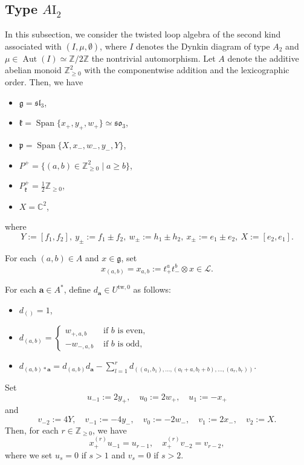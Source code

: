 \documentclass[12pt,a4paper]{amsart}
\theoremstyle{definition}
\numberwithin{equation}{subsection}
\begin{document}
\subsection{Type $A\mathrm{I}_2$}
In this subsection, we consider the twisted loop algebra of the second kind associated with $(I,\mu,\emptyset)$, where
$I$ denotes the Dynkin diagram of type $A_2$ and $\mu \in \operatorname{Aut}(I) \simeq \mathbb{Z}/2\mathbb{Z}$ the nontrivial automorphism.
Let $A$ denote the additive abelian monoid $\mathbb{Z}_{\geq 0}^2$ with the componentwise addition and the lexicographic order.
Then, we have
\begin{itemize}
  \item $\mathfrak{g} = \mathfrak{sl}_3$,
  \item $\mathfrak{k} = \operatorname{Span}\{ x_+,y_+,w_+ \} \simeq \mathfrak{so}_3$,
  \item $\mathfrak{p} = \operatorname{Span}\{ X,x_-,w_-,y_-,Y \}$,
  \item $P^+ = \{ (a,b) \in \mathbb{Z}_{\geq 0}^2 \mid a \geq b \}$,
  \item $P_\mathfrak{k}^+ = \frac{1}{2} \mathbb{Z}_{\geq 0}$,
  \item $X = \mathbb{C}^2$,
\end{itemize}
where
\[
  Y := [f_1,f_2], \ y_\pm := f_1 \pm f_2, \ w_\pm := h_1 \pm h_2, \ x_\pm := e_1 \pm e_2, \ X := [e_2,e_1].
\]

For each $(a,b) \in A$ and $x \in \mathfrak{g}$, set
\[
  x_{(a,b)} = x_{a,b} := t_+^a t_-^b \otimes x \in \mathcal{L}.
\]

For each $\mathbf{a} \in A^*$, define $d_\mathbf{a} \in U^{\mathrm{tw}, 0}$ as follows:
\begin{itemize}
  \item $d_{()} = 1$,
  \item $d_{(a,b)} = \begin{cases}
    w_{+,a,b} & \text{ if $b$ is even},\\
    -w_{-,a,b} & \text{ if $b$ is odd},
  \end{cases}$
  \item $d_{(a,b)*\mathbf{a}} = d_{(a,b)}d_\mathbf{a} - \sum_{l=1}^r d_{((a_1,b_1),\dots,(a_l+a,b_l+b),\dots,(a_r,b_r))}$.
\end{itemize}

Set
\[
  u_{-1} := 2y_+, \quad u_0 := 2w_+, \quad u_1 := -x_+
\]
and
\[
  v_{-2} := 4Y, \quad v_{-1} := -4y_-, \quad v_0 := -2w_-, \quad v_1 := 2x_-, \quad v_2 := X.
\]
Then, for each $r \in \mathbb{Z}_{\geq 0}$, we have
\[
  x_+^{(r)} u_{-1} = u_{r-1}, \quad x_+^{(r)} v_{-2} = v_{r-2},
\]
where we set $u_s = 0$ if $s  > 1$ and $v_s = 0$ if $s > 2$.
\end{document}
